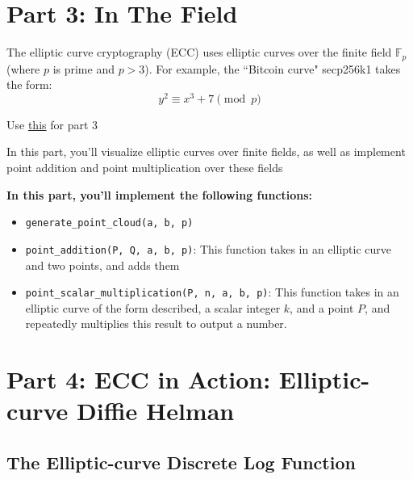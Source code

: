 \documentclass{article}
\begin{document}
\section*{Part 3: In The Field}
The elliptic curve cryptography (ECC) uses elliptic curves over the finite field $\mathbb{F}_{p}$ (where $p$ is prime and $p > 3$). For example, the ``Bitcoin curve" secp256k1 takes the form:
$$y^{2} \equiv x^{3} + 7 \pmod{p}$$


Use \href{https://andrea.corbellini.name/2015/06/08/elliptic-curve-cryptography-breaking-security-and-a-comparison-with-rsa/}{this} for part 3

\begin{tcolorbox}
    In this part, you'll visualize elliptic curves over finite fields, as well as implement point addition and point multiplication over these fields

    
    \textbf{In this part, you'll implement the following functions:}
    \begin{itemize}
        \item \lstinline{generate_point_cloud(a, b, p)}
        \item \lstinline{point_addition(P, Q, a, b, p)}: This function takes in an elliptic curve and two points, and adds them
        \item \lstinline{point_scalar_multiplication(P, n, a, b, p)}: This function takes in an elliptic curve of the form described, a scalar integer $k$, and a point $P$, and repeatedly multiplies this result to output a number.
    \end{itemize}
    
\end{tcolorbox}

\section*{Part 4: ECC in Action: Elliptic-curve Diffie Helman}



\subsection*{The Elliptic-curve Discrete Log Function}
\end{document}
